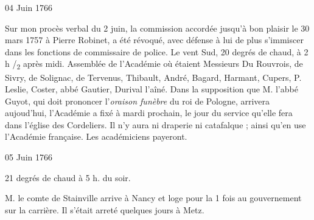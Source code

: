                      \begin{diary}{04 Juin 1766}{}

                         Sur mon procès verbal du
                              2 juin, la commission
                           accordée jusqu'à bon plaisir le 30 mars
                              1757 à
                           Pierre Robinet, a été
                           révoqué, avec défense à
                           lui de plus s'immiscer dans les fonctions
                           de commissaire de police.
                           Le vent Sud, 20 degrés de chaud, à 2 h /\textsubscript{2}
                              après midi.
                           Assemblée de l'Académie où
                           étaient Messieurs
                           Du Rouvrois, de Sivry, de
                              Solignac, de Tervenus,
                           Thibault, André, Bagard, Harmant,
                              Cupers,
                           P. Leslie, Coster, abbé
                              Gautier, Durival
                              l'aîné.
                           Dans la supposition que M. l'abbé Guyot,
                           qui doit prononcer l'\emph{oraison funèbre} du roi de Pologne,
                           arrivera aujoud'hui, l'Académie a fixé à
                           mardi prochain, le jour du service qu'elle fera
                           dans l’église des
                              Cordeliers. Il n'y aura ni
                           draperie ni catafalque ;
                           ainsi qu'en use
                           l'Académie
                              française. Les académiciens
                           payeront. \bigskip


                     \end{diary}

                     \begin{diary}{05 Juin 1766}{}


                           21 degrés de chaud à 5 h. du soir. \bigskip



                           M. le comte de Stainville arrive à
                              Nancy
                           et loge pour la 1 fois au gouvernement sur
                           la carrière. Il s'était arreté quelques jours
                           à Metz. \bigskip


                     \end{diary}

